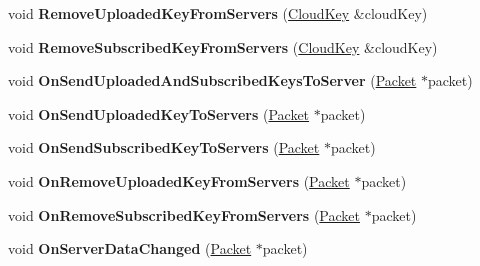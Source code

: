 \begin{DoxyCompactItemize}
\item 
\hypertarget{class_rak_net_1_1_cloud_server_a3d2bb506194c338653f2fae841a0bc39}{void {\bfseries Remove\-Uploaded\-Key\-From\-Servers} (\hyperlink{struct_rak_net_1_1_cloud_key}{Cloud\-Key} \&cloud\-Key)}\label{class_rak_net_1_1_cloud_server_a3d2bb506194c338653f2fae841a0bc39}

\item 
\hypertarget{class_rak_net_1_1_cloud_server_aab0e66312f753fd103048764639c2a6b}{void {\bfseries Remove\-Subscribed\-Key\-From\-Servers} (\hyperlink{struct_rak_net_1_1_cloud_key}{Cloud\-Key} \&cloud\-Key)}\label{class_rak_net_1_1_cloud_server_aab0e66312f753fd103048764639c2a6b}

\item 
\hypertarget{class_rak_net_1_1_cloud_server_afad0145c74eb2eb410ef210f63087dee}{void {\bfseries On\-Send\-Uploaded\-And\-Subscribed\-Keys\-To\-Server} (\hyperlink{struct_rak_net_1_1_packet}{Packet} $\ast$packet)}\label{class_rak_net_1_1_cloud_server_afad0145c74eb2eb410ef210f63087dee}

\item 
\hypertarget{class_rak_net_1_1_cloud_server_abdd476024e9f71c56d65cbb3c67e6bcc}{void {\bfseries On\-Send\-Uploaded\-Key\-To\-Servers} (\hyperlink{struct_rak_net_1_1_packet}{Packet} $\ast$packet)}\label{class_rak_net_1_1_cloud_server_abdd476024e9f71c56d65cbb3c67e6bcc}

\item 
\hypertarget{class_rak_net_1_1_cloud_server_ac380b1d4c7d301f2c16f41eae164b0e4}{void {\bfseries On\-Send\-Subscribed\-Key\-To\-Servers} (\hyperlink{struct_rak_net_1_1_packet}{Packet} $\ast$packet)}\label{class_rak_net_1_1_cloud_server_ac380b1d4c7d301f2c16f41eae164b0e4}

\item 
\hypertarget{class_rak_net_1_1_cloud_server_ac636f3cc942e9612b81f0d2cce4ee2a9}{void {\bfseries On\-Remove\-Uploaded\-Key\-From\-Servers} (\hyperlink{struct_rak_net_1_1_packet}{Packet} $\ast$packet)}\label{class_rak_net_1_1_cloud_server_ac636f3cc942e9612b81f0d2cce4ee2a9}

\item 
\hypertarget{class_rak_net_1_1_cloud_server_aff12c61a1b4e9ac1ecb0367c2f4899ed}{void {\bfseries On\-Remove\-Subscribed\-Key\-From\-Servers} (\hyperlink{struct_rak_net_1_1_packet}{Packet} $\ast$packet)}\label{class_rak_net_1_1_cloud_server_aff12c61a1b4e9ac1ecb0367c2f4899ed}

\item 
\hypertarget{class_rak_net_1_1_cloud_server_ac0dde04da454596324e1040c7cd05a40}{void {\bfseries On\-Server\-Data\-Changed} (\hyperlink{struct_rak_net_1_1_packet}{Packet} $\ast$packet)}\label{class_rak_net_1_1_cloud_server_ac0dde04da454596324e1040c7cd05a40}


\end{DoxyCompactItemize}
